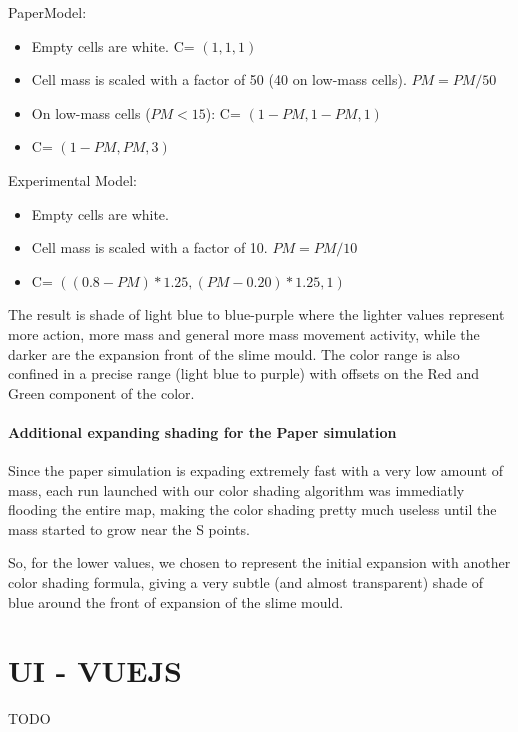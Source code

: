 PaperModel:

\begin{itemize}
	\item Empty cells are white. C= $(1,1,1)$
	\item Cell mass is scaled with a factor of 50 (40 on low-mass cells). $PM = PM/50$
	\item On low-mass cells ($PM < 15$): C= $(1-PM,1-PM,1)$
	\item C= $(1-PM,PM,3)$
\end{itemize}

Experimental Model:

\begin{itemize}
	\item Empty cells are white.
	\item Cell mass is scaled with a factor of 10. $PM = PM/10$
	\item C= $((0.8-PM)*1.25,(PM-0.20)*1.25,1)$
\end{itemize}

The result is shade of light blue to blue-purple where the lighter values represent more action, more mass and general more mass movement activity, while the darker are the expansion front of the slime mould. The color range is also confined in a precise range (light blue to purple) with offsets on the Red and Green component of the color.

\paragraph{Additional expanding shading for the Paper simulation}

Since the paper simulation is expading extremely fast with a very low amount of mass, each run launched with our color shading algorithm was immediatly flooding the entire map, making the color shading pretty much useless until the mass started to grow near the S points.

So, for the lower values, we chosen to represent the initial expansion with another color shading formula, giving a very subtle (and almost transparent) shade of blue around the front of expansion of the slime mould.

\section{UI - VUEJS}

TODO